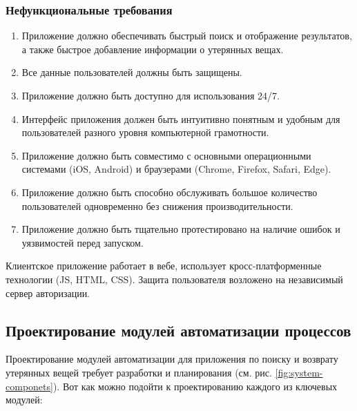 \subsubsection{Нефункциональные требования}

\begin{enumerate}
	\item Приложение должно обеспечивать быстрый поиск и отображение результатов, а также быстрое добавление информации о утерянных вещах.
	\item Все данные пользователей должны быть защищены.
	\item Приложение должно быть доступно для использования 24/7.
	\item Интерфейс приложения должен быть интуитивно понятным и удобным для пользователей разного уровня компьютерной грамотности.
	\item Приложение должно быть совместимо с основными операционными системами (iOS, Android) и браузерами (Chrome, Firefox, Safari, Edge).
	\item Приложение должно быть способно обслуживать большое количество пользователей одновременно без снижения производительности.
	\item Приложение должно быть тщательно протестировано на наличие ошибок и уязвимостей перед запуском.
\end{enumerate}

Клиентское приложение работает в вебе, использует кросс-платформенные технологии (JS, HTML, CSS). Защита пользователя возложено на независимый сервер авторизации.

\subsection{Проектирование модулей автоматизации процессов}

Проектирование модулей автоматизации для приложения по поиску и возврату утерянных вещей требует разработки и планирования (см. рис. \ref{fig:system-componets}). Вот как можно подойти к проектированию каждого из ключевых модулей:

